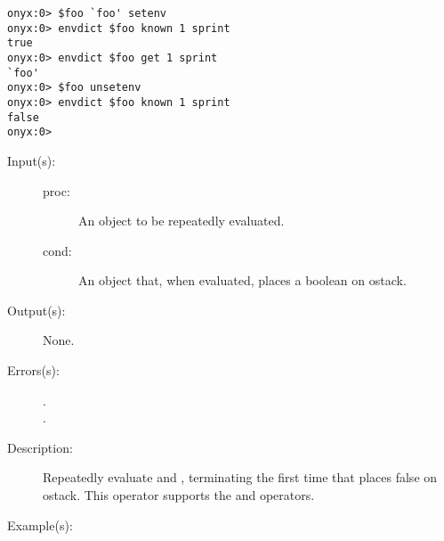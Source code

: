 \begin{description}
\begin{description}
\begin{verbatim}
onyx:0> $foo `foo' setenv
onyx:0> envdict $foo known 1 sprint
true
onyx:0> envdict $foo get 1 sprint
`foo'
onyx:0> $foo unsetenv
onyx:0> envdict $foo known 1 sprint
false
onyx:0>
		\end{verbatim}
	\end{description}
\label{systemdict:until}
\item[{\onyxop{proc cond}{until}{--}}: ]
	\begin{description}\item[]
	\item[Input(s): ]
		\begin{description}\item[]
		\item[proc: ]
			An object to be repeatedly evaluated.
		\item[cond: ]
			An object that, when evaluated, places a boolean on
			ostack.
		\end{description}
	\item[Output(s): ] None.
	\item[Errors(s): ]
		\begin{description}\item[]
		\item[.]
		\item[.]
		\end{description}
	\item[Description: ]
		Repeatedly evaluate  and , terminating
		the first time that  places false on ostack.  This
		operator supports the
		 and
		 operators.
	\item[Example(s): ]\begin{verbatim}


\end{verbatim}
\end{description}
\end{description}
